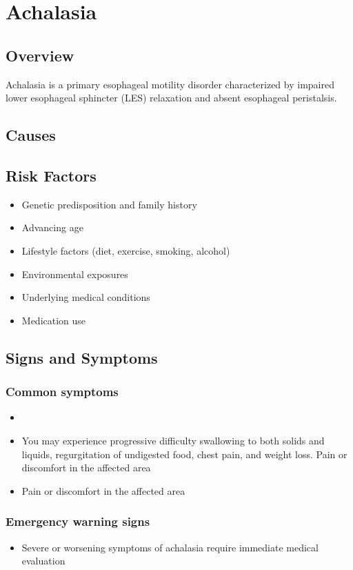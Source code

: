 \chapter{Achalasia}
\label{sec:Achalasia}

\section{Overview}
Achalasia is a primary esophageal motility disorder characterized by impaired lower esophageal sphincter (LES) relaxation and absent esophageal peristalsis.
\section{Causes}
\section{Risk Factors}

\begin{itemize}[noitemsep]
  \item Genetic predisposition and family history
  \item Advancing age
  \item Lifestyle factors (diet, exercise, smoking, alcohol)
  \item Environmental exposures
  \item Underlying medical conditions
  \item Medication use
\end{itemize}
\section{Signs and Symptoms}

\subsection{Common symptoms}
\begin{itemize}[noitemsep]
  \item \item You may experience progressive difficulty swallowing to both solids and liquids, regurgitation of undigested food, chest pain, and weight loss. Pain or discomfort in the affected area    \item Pain or discomfort in the affected area
  \end{itemize}

\subsection{Emergency warning signs}
\begin{itemize}[noitemsep]
  \item Severe or worsening symptoms of achalasia require immediate medical evaluation
\end{itemize}
